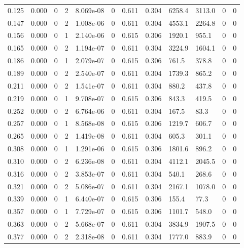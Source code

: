 \documentclass[preview]{standalone}
\begin{document}
{{\begin{tabular}{L{1.2cm}C{1.2cm} C{0.3cm}C{0.5cm} C{1.4cm}C{1.4cm} C{1.4cm}C{1.4cm} C{1.6cm}C{1.6cm} C{1.6cm}C{1.6cm}}
  0.125  &  0.000  & 0     &  2 &  8.069e-08  & 0  &  0.611&   0.304& 6258.4 & 3113.0   &  0 & 0  \\ 
  0.147  &  0.000  & 0     &  2 &  1.008e-06  & 0  &  0.611&   0.304& 4553.1 & 2264.8   &  0 & 0  \\ 
  0.156  &  0.000  & 0     &  1 &  2.140e-06  & 0  &  0.615&   0.306& 1920.1 & 955.1   &  0 & 0  \\ 
  0.165  &  0.000  & 0     &  2 &  1.194e-07  & 0  &  0.611&   0.304& 3224.9 & 1604.1   &  0 & 0  \\ 
  0.186  &  0.000  & 0     &  1 &  2.079e-07  & 0  &  0.615&   0.306& 761.5 & 378.8   &  0 & 0  \\ 
  0.189  &  0.000  & 0     &  2 &  2.540e-07  & 0  &  0.611&   0.304& 1739.3 & 865.2   &  0 & 0  \\ 
  0.211  &  0.000  & 0     &  2 &  1.541e-07  & 0  &  0.611&   0.304& 880.2 & 437.8   &  0 & 0  \\ 
  0.219  &  0.000  & 0     &  1 &  9.708e-07  & 0  &  0.615&   0.306& 843.3 & 419.5   &  0 & 0  \\ 
  0.252  &  0.000  & 0     &  2 &  6.764e-06  & 0  &  0.611&   0.304& 167.5 & 83.3   &  0 & 0  \\ 
  0.257  &  0.000  & 0     &  1 &  8.568e-08  & 0  &  0.615&   0.306& 1219.7 & 606.7   &  0 & 0  \\ 
  0.265  &  0.000  & 0     &  2 &  1.419e-08  & 0  &  0.611&   0.304& 605.3 & 301.1   &  0 & 0  \\ 
  0.308  &  0.000  & 0     &  1 &  1.291e-06  & 0  &  0.615&   0.306& 1801.6 & 896.2   &  0 & 0  \\ 
  0.310  &  0.000  & 0     &  2 &  6.236e-08  & 0  &  0.611&   0.304& 4112.1 & 2045.5   &  0 & 0  \\ 
  0.316  &  0.000  & 0     &  2 &  3.853e-07  & 0  &  0.611&   0.304& 540.1 & 268.6   &  0 & 0  \\ 
  0.321  &  0.000  & 0     &  2 &  5.086e-07  & 0  &  0.611&   0.304& 2167.1 & 1078.0   &  0 & 0  \\ 
  0.339  &  0.000  & 0     &  1 &  6.440e-07  & 0  &  0.615&   0.306& 155.4 & 77.3   &  0 & 0  \\ 
  0.357  &  0.000  & 0     &  1 &  7.729e-07  & 0  &  0.615&   0.306& 1101.7 & 548.0   &  0 & 0  \\ 
  0.363  &  0.000  & 0     &  2 &  5.668e-07  & 0  &  0.611&   0.304& 3834.9 & 1907.5   &  0 & 0  \\ 
  0.377  &  0.000  & 0     &  2 &  2.318e-08  & 0  &  0.611&   0.304& 1777.0 & 883.9   &  0 & 0  \\ 

\end{tabular}}}
\end{document}
